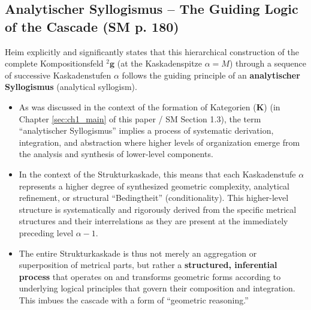 \documentclass[
    12pt,              %
    a4paper,           %
    headings=normal,   %
    twoside=true,      %
    BCOR=8mm,          %
]{scrbook}
\newcommand{\q}[1]{\enquote{#1}}
\newcommand{\kategorie}{\bm{K}}
\newcommand{\kompositionsfeld}{{}^2\mathbf{g}}
\newcommand{\kaskadenstufe}{\alpha}
\begin{document}
\subsection{Analytischer Syllogismus – The Guiding Logic of the Cascade (SM p. 180)}
\label{sec:ch9_1_2_analytischer_syllogismus}
Heim explicitly and significantly states that this hierarchical construction of the complete Kompositionsfeld \(\kompositionsfeld\) (at the Kaskadenspitze \(\kaskadenstufe=M\)) through a sequence of successive Kaskadenstufen \(\kaskadenstufe\) follows the guiding principle of an \textbf{analytischer Syllogismus} (analytical syllogism).
\begin{itemize}
    \item   As was discussed in the context of the formation of Kategorien (\(\kategorie\)) (in Chapter \ref{sec:ch1_main} of this paper / SM Section 1.3), the term \q{analytischer Syllogismus} implies a process of systematic derivation, integration, and abstraction where higher levels of organization emerge from the analysis and synthesis of lower-level components.
    \item   In the context of the Strukturkaskade, this means that each Kaskadenstufe \(\kaskadenstufe\) represents a higher degree of synthesized geometric complexity, analytical refinement, or structural \q{Bedingtheit} (conditionality). This higher-level structure is systematically and rigorously derived from the specific metrical structures and their interrelations as they are present at the immediately preceding level \(\kaskadenstufe-1\).
    \item   The entire Strukturkaskade is thus not merely an aggregation or superposition of metrical parts, but rather a \textbf{structured, inferential process} that operates on and transforms geometric forms according to underlying logical principles that govern their composition and integration. This imbues the cascade with a form of \q{geometric reasoning.}
\end{itemize}
\end{document}

